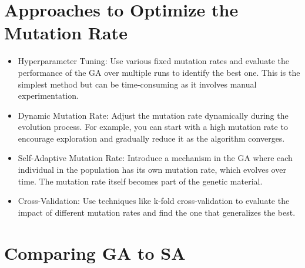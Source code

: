 \documentclass[
  letterpaper,
  DIV=11,
  numbers=noendperiod]{scrreprt}
\providecommand{\tightlist}{%
  \setlength{\itemsep}{0pt}\setlength{\parskip}{0pt}}\usepackage{longtable,booktabs,array}
\begin{document}
\section{Approaches to Optimize the Mutation
Rate}\label{approaches-to-optimize-the-mutation-rate}

\begin{itemize}
\tightlist
\item
  Hyperparameter Tuning: Use various fixed mutation rates and evaluate
  the performance of the GA over multiple runs to identify the best one.
  This is the simplest method but can be time-consuming as it involves
  manual experimentation.
\item
  Dynamic Mutation Rate: Adjust the mutation rate dynamically during the
  evolution process. For example, you can start with a high mutation
  rate to encourage exploration and gradually reduce it as the algorithm
  converges.
\item
  Self-Adaptive Mutation Rate: Introduce a mechanism in the GA where
  each individual in the population has its own mutation rate, which
  evolves over time. The mutation rate itself becomes part of the
  genetic material.
\item
  Cross-Validation: Use techniques like k-fold cross-validation to
  evaluate the impact of different mutation rates and find the one that
  generalizes the best.
\end{itemize}

\section{Comparing GA to SA}\label{comparing-ga-to-sa}
\end{document}

